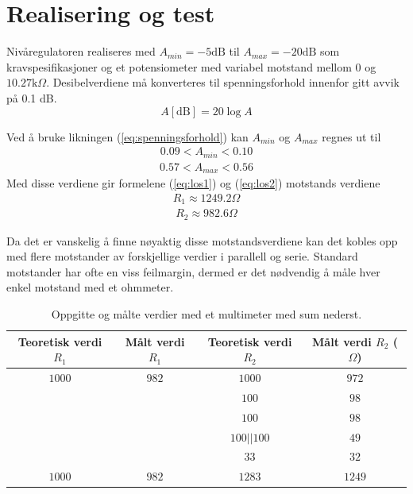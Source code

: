 \documentclass[a4paper,11pt,norsk]{article}
\begin{document}
\section{Realisering og test}
\label{sec:realisering}
Nivåregulatoren realiseres med $A_{min} = -5 \text{dB}$ til $A_{max} = -20 \text{dB}$ som kravspesifikasjoner og et potensiometer med variabel motstand mellom $0$ og $10.27\text{k}\Omega$. Desibelverdiene må konverteres til spenningsforhold innenfor gitt avvik på 0.1 dB. 
\begingroup
\Large
\begin{equation}
    \label{eq:spenningsforhold}
    A[\text{dB}] = 20\log{A}
\end{equation}
\endgroup 

Ved å bruke likningen (\ref{eq:spenningsforhold}) kan $A_{min}$ og $A_{max}$ regnes ut til
\begingroup
\Large
\begin{align*}
    0.09 < A_{min} < 0.10
\end{align*}
\begin{align*}
    0.57 < A_{max} < 0.56
\end{align*}
\endgroup
Med disse verdiene gir formelene (\ref{eq:los1}) og (\ref{eq:los2}) motstands verdiene
\begingroup
\Large
\begin{align*}
    R_1 \approx 1249.2 \Omega
\end{align*}
\begin{align*}
    R_2 \approx 982.6 \Omega
\end{align*}
\endgroup

Da det er vanskelig å finne nøyaktig disse motstandsverdiene kan det kobles opp med flere motstander av forskjellige verdier i parallell og serie. Standard motstander har ofte en viss feilmargin, dermed er det nødvendig å måle hver enkel motstand med et ohmmeter.

\begin{table}[h]
  \centering
  \caption{Oppgitte og målte verdier med et multimeter med sum nederst.}
  \begin{tabular}{|c|c|c|c|}
    \hline\hline
    Teoretisk verdi $R_1$ & Målt verdi $R_1$ & Teoretisk verdi $R_2$ & Målt verdi $R_2$ ($\Omega$) \\
    \hline\hline
    $1000$ & $982$ & $1000$ & $972$\\
    & & $100$ & $98$\\
    & & $100$ & $98$\\
    & & $100||100$ & $49$\\
    & & $33$ & $32$ \\
    \hline\hline
    $1000$ & $982$ & $1283$ & $1249$\\
    \hline\hline
  \end{tabular}
  \label{tabel:seriemotstander}
\end{table}
\end{document}
